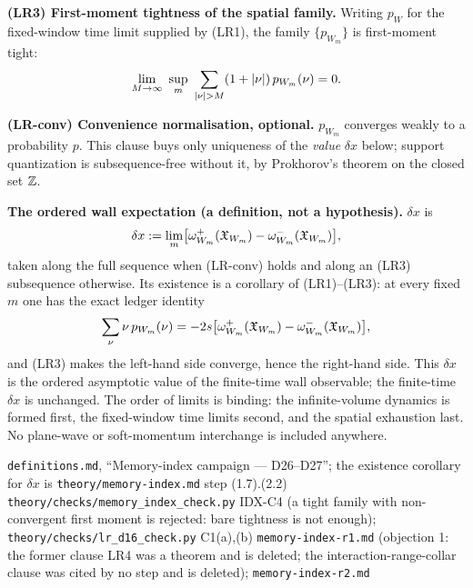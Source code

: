 \begin{definition}
\medskip\noindent\textbf{(LR3) First-moment tightness of the spatial
family.} Writing $p_W$ for the fixed-window time limit supplied by (LR1), the
family $\{p_{W_m}\}$ is first-moment tight:
\begin{equation}
  \lim_{M\to\infty}\ \sup_m\ \sum_{\abs{\nu}>M}(1+\abs{\nu})\,p_{W_m}(\nu)=0 .
  \label{eq:lr3}
\end{equation}

\medskip\noindent\textbf{(LR-conv) Convenience normalisation, optional.}
$p_{W_m}$ converges weakly to a probability $p$. This clause buys only
uniqueness of the \emph{value} $\delta x$ below; support quantization is
subsequence-free without it, by Prokhorov's theorem on the closed set $\mathbb{Z}$.

\medskip\noindent\textbf{The ordered wall expectation (a definition, not a
hypothesis).} $\delta x$ is
\begin{equation}
  \delta x:=\lim_m\bigl[\omega^{+}_{W_m}(\mathfrak{X}_{W_m})
                       -\omega^{-}_{W_m}(\mathfrak{X}_{W_m})\bigr],
  \label{eq:deltax-def}
\end{equation}
taken along the full sequence when (LR-conv) holds and along an (LR3)
subsequence otherwise. Its existence is a corollary of (LR1)--(LR3): at every
fixed $m$ one has the exact ledger identity
\begin{equation}
  \sum_\nu \nu\,p_{W_m}(\nu)
   =-2s\bigl[\omega^{+}_{W_m}(\mathfrak{X}_{W_m})
             -\omega^{-}_{W_m}(\mathfrak{X}_{W_m})\bigr],
  \label{eq:ledger-fixed-m}
\end{equation}
and (LR3) makes the left-hand side converge, hence the right-hand side. This
$\delta x$ is the ordered asymptotic value of the finite-time wall observable;
the finite-time $\delta x$ is unchanged. The order of limits is binding: the
infinite-volume dynamics is formed first, the fixed-window time limits
second, and the spatial exhaustion last. No plane-wave or soft-momentum
interchange is included anywhere.
\end{definition}

{\texttt{definitions.md}, ``Memory-index campaign --- D26--D27''; the
 existence corollary for $\delta x$ is \texttt{theory/memory-index.md} step
 (1.7).(2.2)}
{\texttt{theory/checks/memory\_index\_check.py} IDX-C4 (a tight family with
 non-convergent first moment is rejected: bare tightness is not enough);
 \texttt{theory/checks/lr\_d16\_check.py} C1(a),(b)}
{\texttt{memory-index-r1.md} (objection 1: the former clause LR4 was a
 theorem and is deleted; the interaction-range-collar clause was cited by no
 step and is deleted); \texttt{memory-index-r2.md}}

